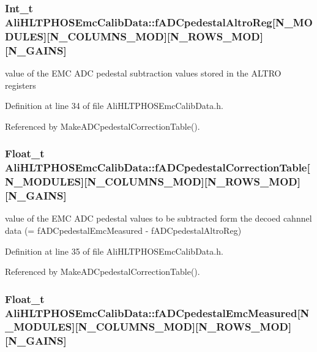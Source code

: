 \subsubsection{\setlength{\rightskip}{0pt plus 5cm}Int\_\-t {\bf Ali\-HLTPHOSEmc\-Calib\-Data::f\-ADCpedestal\-Altro\-Reg}[N\_\-MODULES][N\_\-COLUMNS\_\-MOD][N\_\-ROWS\_\-MOD][N\_\-GAINS]\hspace{0.3cm}{\tt  [protected]}}\label{classAliHLTPHOSEmcCalibData_AliHLTPHOSEmcCalibDatap2}


value of the EMC ADC pedestal subtraction values stored in the ALTRO registers 

Definition at line 34 of file Ali\-HLTPHOSEmc\-Calib\-Data.h.

Referenced by Make\-ADCpedestal\-Correction\-Table().
\subsubsection{\setlength{\rightskip}{0pt plus 5cm}Float\_\-t {\bf Ali\-HLTPHOSEmc\-Calib\-Data::f\-ADCpedestal\-Correction\-Table}[N\_\-MODULES][N\_\-COLUMNS\_\-MOD][N\_\-ROWS\_\-MOD][N\_\-GAINS]\hspace{0.3cm}{\tt  [protected]}}\label{classAliHLTPHOSEmcCalibData_AliHLTPHOSEmcCalibDatap3}


value of the EMC ADC pedestal values to be subtracted form the decoed cahnnel data (= f\-ADCpedestal\-Emc\-Measured - f\-ADCpedestal\-Altro\-Reg) 

Definition at line 35 of file Ali\-HLTPHOSEmc\-Calib\-Data.h.

Referenced by Make\-ADCpedestal\-Correction\-Table().
\subsubsection{\setlength{\rightskip}{0pt plus 5cm}Float\_\-t {\bf Ali\-HLTPHOSEmc\-Calib\-Data::f\-ADCpedestal\-Emc\-Measured}[N\_\-MODULES][N\_\-COLUMNS\_\-MOD][N\_\-ROWS\_\-MOD][N\_\-GAINS]\hspace{0.3cm}{\tt  [protected]}}\label{classAliHLTPHOSEmcCalibData_AliHLTPHOSEmcCalibDatap1}


